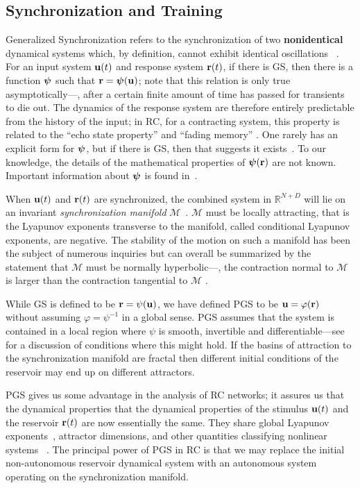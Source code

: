 \documentclass[12pt]{article}
\begin{document}
\subsection{Synchronization and Training}
Generalized Synchronization refers to the synchronization of two {\bf nonidentical} dynamical systems which, by definition, cannot exhibit identical oscillations ~\cite{sushchik95,ars96,kocarev96,Pyragas98}.  For an input system $\mbox{$\bf{u}$}(t)$ and response system $\mbox{{\bf r}}(t)$, if there is GS, then there is a function $\mbox{$\boldsymbol{\psi}$}$ such that $\mbox{{\bf r}} = \mbox{$\boldsymbol{\psi}$}(\mbox{$\bf{u}$})$; note that this relation is only true asymptotically---\ie, after a certain finite amount of time has passed for transients to die out. The dynamics of the response system are therefore entirely predictable from the history of the input; in RC, for a contracting system, this property is related to the ``echo state property'' \cite{Jaeger01} and ``fading memory'' \cite{boyd85}. One rarely has an explicit form for $\mbox{$\boldsymbol{\psi}$}$, but if there is GS, then that suggests it exists~\cite{abar96,hunt19}.  To our knowledge, the details of the mathematical properties of $\mbox{$\boldsymbol{\psi}$}(\mbox{{\bf r}})$ are not known. Important information about $\mbox{$\boldsymbol{\psi}$}$ is found in~\cite{stark97,stark99,josic00}.

When $\mbox{$\bf{u}$}(t)$ and $\mbox{{\bf r}}(t)$ are synchronized, the combined system in $\mathbb{R}^{N+D}$ will lie on an invariant {\it synchronization manifold} $\mathcal{M}$~\cite{Pecora97}.  $\mathcal{M}$ must be locally attracting, that is the Lyapunov exponents transverse to the manifold, called conditional Lyapunov exponents, are negative. The stability of the motion on such a manifold has been the subject of numerous inquiries \cite{Pecora97, Pecora00} but can overall be summarized by the statement that $\mathcal{M}$ must be normally hyperbolic---\ie, the contraction normal to $\mathcal{M}$ is larger than the contraction tangential to $\mathcal{M}$ \cite{Kocarev00}.

While GS is defined to be $\mbox{{\bf r}} = \psi(\mbox{$\bf{u}$})$, we have defined PGS to be $\mbox{$\bf{u}$} = \varphi(\mbox{{\bf r}})$ without assuming $\varphi = \psi^{-1}$ in a global sense.  PGS assumes that the system is contained in a local region where $\psi$ is smooth, invertible and differentiable---see \cite{Hunt97} for a discussion of conditions where this might hold.  If the basins of attraction to the synchronization manifold are fractal then different initial conditions of the reservoir may end up on different attractors.

PGS gives us some advantage in the analysis of RC networks; it assures us that the dynamical properties that the dynamical properties of the stimulus $\mbox{$\bf{u}$}(t)$ and the reservoir $\mbox{{\bf r}}(t)$ are now essentially the same. They share global Lyapunov exponents~\cite{ose68}, attractor dimensions, and other quantities classifying nonlinear systems ~\cite{sushchik95}.  The principal power of PGS in RC is that we may replace the initial non-autonomous reservoir dynamical system with an autonomous system operating on the synchronization manifold.
 
\end{document}
